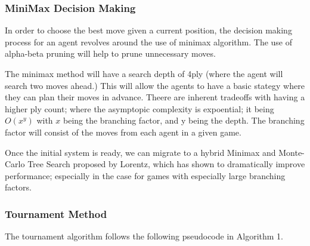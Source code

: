 \documentclass[12pt,a4paper]{article}
\begin{document}
\subsubsection{MiniMax Decision Making}

    In order to choose the best move given a current position, the decision making process for an agent revolves around the use of minimax algorithm. The use of alpha-beta pruning will help to prune unnecessary moves.

    The minimax method will have a search depth of 4ply (where the agent will search two moves ahead.) This will allow the agents to have a basic stategy where they can plan their moves in advance. Theere are inherent tradeoffs with having a higher ply count; where the asymptopic complexity is expoential; it being $O(x^y)$ with $x$ being the branching factor, and y being the depth. The branching factor will consist of the moves from each agent in a given game.

    Once the initial system is ready, we can migrate to a hybrid Minimax and  Monte-Carlo Tree Search proposed by Lorentz, which has shown to dramatically improve performance; especially in the case for games with especially large branching factors.

\subsubsection{Tournament Method}

    The tournament algorithm follows the following pseudocode in Algorithm 1.
\end{document}
